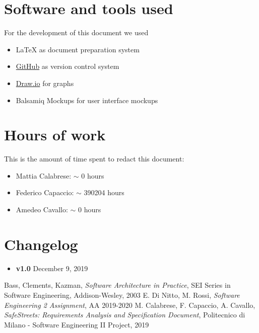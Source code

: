 \setlength{\parindent}{4ex}
\setlength{\parskip}{1ex}

\begin{appendices}

	\section{Software and tools used}
	For the development of this document we used
	\begin{itemize}
		\item \LaTeX{} as document preparation system
		\item \href{http://github.com}{GitHub} as version control system
		\item \href{http://draw.io}{Draw.io} for graphs 
		\item Balsamiq Mockups for user interface mockups
	\end{itemize}
	
	\section{Hours of work}
	This is the amount of time spent to redact this document:
	\begin{itemize}
		\item Mattia Calabrese: $\sim$ 0 hours
		\item Federico Capaccio: $\sim$ 390204 hours
		\item Amedeo Cavallo: $\sim$ 0 hours
	\end{itemize}
	
		\section{Changelog}
	\begin{itemize}
		\item \textbf{v1.0} December 9, 2019
	\end{itemize}
	
\end{appendices}


\begin{thebibliography}{9}

Bass, Clements, Kazman, \emph{Software Architecture in Practice}, SEI Series in Software Engineering, Addison-­Wesley, 2003
 E. Di Nitto, M. Rossi, \emph{Software Engineering 2 Assignment}, AA 2019-2020
 M. Calabrese, F. Capaccio, A. Cavallo, \emph{SafeStreets: Requirements Analysis and Specification Document}, Politecnico di Milano - Software Engineering II Project, 2019

\end{thebibliography}